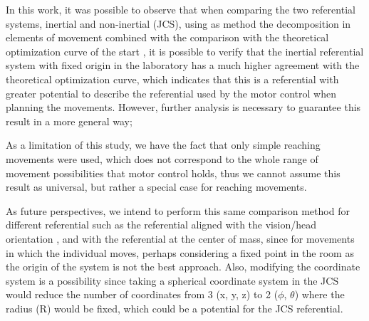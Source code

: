 \documentclass{article}
\begin{document}
In this work, it was possible to observe that when comparing the two referential systems, inertial and non-inertial (JCS), using as method the decomposition in elements of movement \cite{miranda} combined with the comparison with the theoretical optimization curve of the start \cite{hogan, hoff}, it is possible to verify that the inertial referential system with fixed origin in the laboratory has a much higher agreement with the theoretical optimization curve, which indicates that this is a referential with greater potential to describe the referential used by the motor control when planning the movements. However, further analysis is necessary to guarantee this result in a more general way;

As a limitation of this study, we have the fact that only simple reaching movements were used, which does not correspond to the whole range of movement possibilities that motor control holds, thus we cannot assume this result as universal, but rather a special case for reaching movements.

As future perspectives, we intend to perform this same comparison method for different referential such as the referential aligned with the vision/head orientation \cite{cabeca}, and with the referential at the center of mass, since for movements in which the individual moves, perhaps considering a fixed point in the room as the origin of the system is not the best approach. Also, modifying the coordinate system is a possibility since taking a spherical coordinate system in the JCS would reduce the number of coordinates from 3 (x, y, z) to 2 (\(\phi\), \(\theta\)) where the radius (R) would be fixed, which could be a potential for the JCS referential.

\printbibliography
\end{document}
